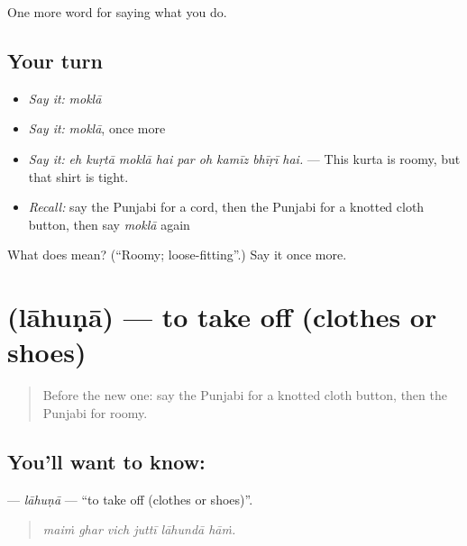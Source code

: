 \begin{grammarlens}[title={What you've built}]
One more word for saying what you do.
\end{grammarlens}

\subsection*{Your turn}
\begin{itemize}
\raggedright
  \item \emph{Say it:} \emph{moklā}
  \item \emph{Say it:} \emph{moklā}, once more
  \item \emph{Say it:} \emph{eh kuṛtā moklā hai par oh kamīz bhīṛī hai.} — This kurta is roomy, but that shirt is tight.
  \item \emph{Recall:} say the Punjabi for a cord, then the Punjabi for a knotted cloth button, then say \emph{moklā} again
\end{itemize}

\begin{tcolorbox}[breakable,colback=teal!4,colframe=teal!35!black,title={Before you move on}]
What does  mean? (\textquotedblleft{}Roomy; loose-fitting\textquotedblright{}.) Say it once more.
\end{tcolorbox}
\section[\texorpdfstring{\pa{ਲਾਹੁਣਾ} (lāhuṇā)}{ਲਾਹੁਣਾ (lāhuṇā)}]{ (lāhuṇā) — to take off (clothes or shoes)}

\label{lesson:PA-C230-lahuna}



\begin{quote}
Before the new one: say the Punjabi for a knotted cloth button, then the Punjabi for roomy.
\end{quote}

\subsection*{You'll want to know: }
\textbf{} — \emph{lāhuṇā} — \textquotedblleft{}to take off (clothes or shoes)\textquotedblright{}.

\begin{quote}
     
\end{quote}

\begin{quote}
\emph{maiṁ ghar vich juttī lāhundā hāṁ.}
\end{quote}

